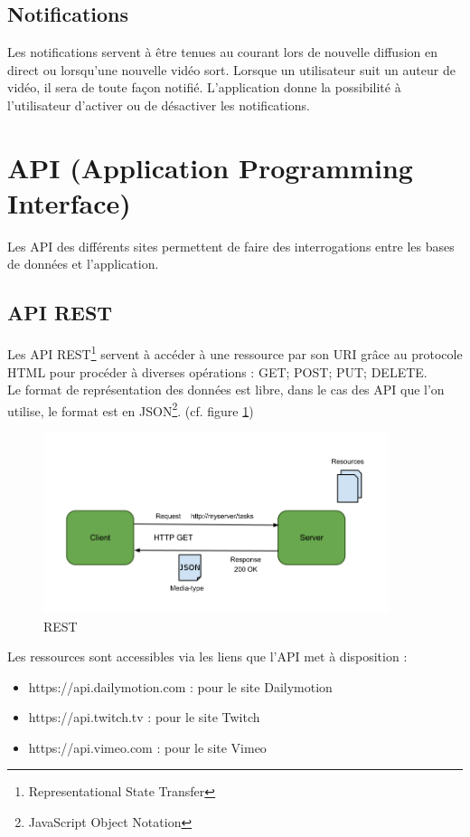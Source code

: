 \documentclass[11pt]{report} %
\begin{document}
		\subsection{Notifications}
		Les notifications servent à être tenues au courant lors de nouvelle diffusion en direct ou lorsqu'une nouvelle vidéo sort.
		Lorsque un utilisateur suit un auteur de vidéo, il sera de toute façon notifié.
		L'application donne la possibilité à l'utilisateur d'activer ou de désactiver les notifications.
		
		
	\newpage
	\section{API (Application Programming Interface)}
	\label{api}
	Les API des différents sites permettent de faire des interrogations entre les bases de données et l'application.
		\subsection{API REST}
		Les API REST\footnote{Representational State Transfer} servent à accéder à une ressource par son URI grâce au protocole HTML pour procéder à diverses opérations : GET; POST; PUT; DELETE. \\		
		Le format de représentation des données est libre, dans le cas des API que l'on utilise, le format est en JSON\footnote{JavaScript Object Notation}. (cf. figure \ref{rest})
		
		\begin{figure}[h]
			\center
			\includegraphics[width=0.9\textwidth]{../img/rest.png}
			\caption{REST}
			\label{rest}
		\end{figure}
		
		\noindent
		Les ressources sont accessibles via les liens que l'API met à disposition :

		\begin{itemize}
		\item https://api.dailymotion.com : pour le site Dailymotion
		\item https://api.twitch.tv : pour le site Twitch
		\item https://api.vimeo.com : pour le site Vimeo
		\end{itemize}
		
\end{document}
